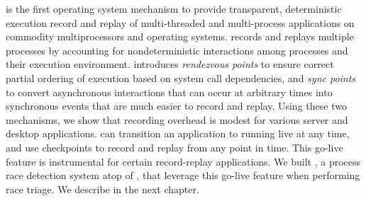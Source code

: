 \scribe is the first operating system mechanism to provide transparent,
deterministic execution record and replay of multi-threaded and multi-process
applications on commodity multiprocessors and operating systems. \scribe records
and replays multiple processes by accounting for nondeterministic interactions
among processes and their execution environment.  \scribe introduces {\em
rendezvous points} to ensure correct partial ordering of execution based on
system call dependencies, and {\em sync points} to convert asynchronous
interactions that can occur at arbitrary times into synchronous events that are
much easier to record and replay.
Using these two mechanisms, we show that \scribe{} recording overhead is modest
for various server and desktop applications.
\scribe can transition an application to running live at any time, and use
checkpoints to record and replay from any point in time.
This go-live feature is instrumental for certain record-replay applications. We
built \racepro, a process race detection system atop of \scribe, that leverage
this go-live feature when performing race triage. We describe \racepro in the
next chapter.
